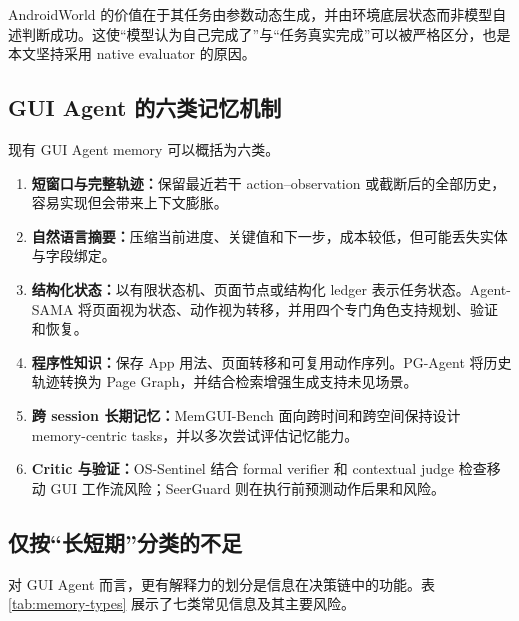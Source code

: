 \documentclass[12pt,a4paper]{ctexart}
\begin{document}
AndroidWorld 的价值在于其任务由参数动态生成，并由环境底层状态而非模型自述判断成功\cite{androidworld}。这使“模型认为自己完成了”与“任务真实完成”可以被严格区分，也是本文坚持采用 native evaluator 的原因。

\subsection{GUI Agent 的六类记忆机制}

现有 GUI Agent memory 可以概括为六类。

\begin{enumerate}[leftmargin=2em]
    \item \textbf{短窗口与完整轨迹：}保留最近若干 action--observation 或截断后的全部历史，容易实现但会带来上下文膨胀。
    \item \textbf{自然语言摘要：}压缩当前进度、关键值和下一步，成本较低，但可能丢失实体与字段绑定。
    \item \textbf{结构化状态：}以有限状态机、页面节点或结构化 ledger 表示任务状态。Agent-SAMA 将页面视为状态、动作视为转移，并用四个专门角色支持规划、验证和恢复\cite{agentsama}。
    \item \textbf{程序性知识：}保存 App 用法、页面转移和可复用动作序列。PG-Agent 将历史轨迹转换为 Page Graph，并结合检索增强生成支持未见场景\cite{pgagent}。
    \item \textbf{跨 session 长期记忆：}MemGUI-Bench 面向跨时间和跨空间保持设计 memory-centric tasks，并以多次尝试评估记忆能力\cite{memgui}。
    \item \textbf{Critic 与验证：}OS-Sentinel 结合 formal verifier 和 contextual judge 检查移动 GUI 工作流风险\cite{ossentinel}；SeerGuard 则在执行前预测动作后果和风险\cite{seerguard}。
\end{enumerate}

\subsection{仅按“长短期”分类的不足}

对 GUI Agent 而言，更有解释力的划分是信息在决策链中的功能。表\ref{tab:memory-types} 展示了七类常见信息及其主要风险。
\end{document}
